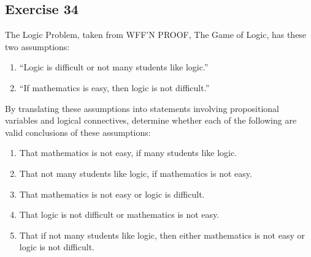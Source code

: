 \documentclass{article}
\begin{document}
\subsection*{Exercise 34}
The Logic Problem, taken from WFF’N PROOF, The Game of Logic, has these two assumptions:
\begin{enumerate}
    \item “Logic is difficult or not many students like logic.”
    \item “If mathematics is easy, then logic is not difficult.”
\end{enumerate}
By translating these assumptions into statements involving propositional variables and logical connectives, determine whether each of the following are valid conclusions of these assumptions:
\begin{enumerate} [label = (\alph*)]
    \item That mathematics is not easy, if many students like logic.
    \item That not many students like logic, if mathematics is not easy.
    \item That mathematics is not easy or logic is difficult.
    \item That logic is not difficult or mathematics is not easy.
    \item That if not many students like logic, then either mathematics is not easy or logic is not difficult.
\end{enumerate}
\end{document}
